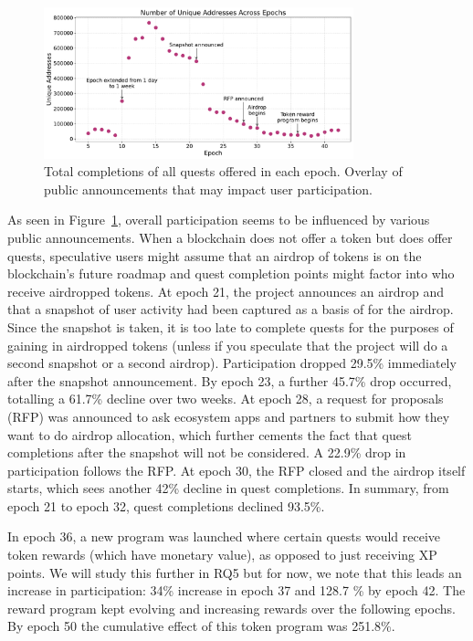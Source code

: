 \begin{figure}[t]
    \centering
    \includegraphics[width=0.8\textwidth]{figures/events.pdf}
    \caption{Total completions of all quests offered in each epoch. Overlay of public announcements that may impact user participation.}
    \label{fig:events}
\end{figure}

As seen in  Figure~\ref{fig:events}, overall participation seems to be influenced by various public announcements. When a blockchain does not offer a token but does offer quests, speculative users might assume that an airdrop of tokens is on the blockchain's future roadmap and quest completion points might factor into who receive airdropped tokens. At epoch 21, the project announces an airdrop and that a snapshot of user activity had been captured as a basis of for the airdrop. Since the snapshot is taken, it is too late to complete quests for the purposes of gaining in airdropped tokens (unless if you speculate that the project will do a second snapshot or a second airdrop). Participation dropped 29.5\% immediately after the snapshot announcement. By epoch 23, a further 45.7\% drop occurred, totalling a 61.7\% decline over two weeks. At epoch 28, a request for proposals (RFP) was announced to ask ecosystem apps and partners to submit how they want to do airdrop allocation, which further cements the fact that quest completions after the snapshot will not be considered. A 22.9\% drop in participation follows the RFP. At epoch 30, the RFP closed and the airdrop itself starts, which sees another 42\% decline in quest completions. In summary, from epoch 21 to epoch 32, quest completions declined 93.5\%.  

In epoch 36, a new program was launched where certain quests would receive token rewards (which have monetary value), as opposed to just receiving XP points. We will study this further in RQ5 but for now, we note that this leads an increase in participation: 34\% increase in epoch 37 and 128.7 \% by epoch 42. The reward program kept evolving and increasing rewards over the following epochs. By epoch 50 the cumulative effect of this token program was 251.8\%.

